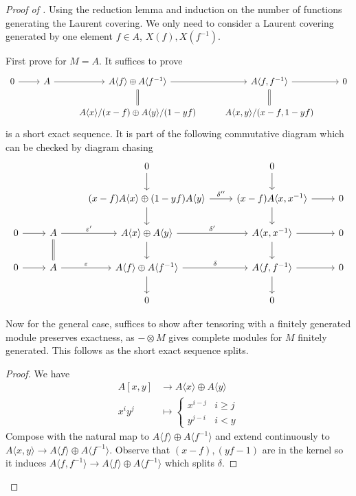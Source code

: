 \documentclass[a4paper]{article}
\begin{document}
\begin{proof}[Proof of ]
  Using the reduction lemma and induction on the number of functions generating the Laurent covering. We only need to consider a Laurent covering generated by one element \(f \in A\), \(X(f), X(f^{-1})\).

  First prove for \(M = A\). It suffices to prove
  \[
    \begin{tikzcd}
      0 \ar[r] & A \ar[r] & A \langle f\rangle \oplus A \langle f^{-1} \rangle \ar[r] \ar[d, equal] & A \langle f, f^{-1} \rangle \ar[r] \ar[d, equal] & 0 \\
      & & A\langle x\rangle/(x - f) \oplus A \langle y\rangle/(1 - yf) & A \langle x, y\rangle/(x - f, 1 - yf)
    \end{tikzcd}
  \]
  is a short exact sequence. It is part of the following commutative diagram which can be checked by diagram chasing
  \[
    \begin{tikzcd}
      & & 0 \ar[d] & 0 \ar[d] \\
      & & (x - f) A \langle x \rangle \oplus (1 - yf) A \langle y\rangle \ar[d] \ar[r, "\delta''"] & (x - f) A \langle x, x^{-1} \rangle \ar[r] \ar[d] & 0 \\
      0 \ar[r] & A \ar[r, "\varepsilon'"] \ar[d, equal] & A \langle x \rangle \oplus A \langle y\rangle \ar[r, "\delta'"] \ar[d] & A\langle x, x^{-1}\rangle \ar[r] \ar[d] & 0 \\
      0 \ar[r] & A \ar[r, "\varepsilon"] & A \langle f\rangle \oplus A \langle f^{-1} \rangle \ar[r, "\delta"] \ar[d] & A \langle f, f^{-1} \rangle \ar[r] \ar[d] & 0 \\
      & & 0 & 0
    \end{tikzcd}
  \]

  Now for the general case, suffices to show after tensoring with a finitely generated module preserves exactness, as \(- \otimes M\) gives complete modules for \(M\) finitely generated. This follows as the short exact sequence splits.

  \begin{proof}
    We have
    \begin{align*}
      A[x, y] &\to A \langle x \rangle \oplus A \langle y\rangle \\
      x^iy^j &\mapsto
               \begin{cases}
                 x^{i - j} & i \geq j \\
                 y^{j - i} & i < y
               \end{cases}
    \end{align*}
    Compose with the natural map to \(A \langle f \rangle \oplus A \langle f^{-1} \rangle\) and extend continuously to \(A \langle x, y \rangle \to A \langle f \rangle \oplus A \langle f^{-1} \rangle\). Observe that \((x - f), (yf - 1)\) are in the kernel so it induces \(A \langle f, f^{-1} \rangle \to A \langle f\rangle \oplus A \langle f^{-1}\rangle\) which splits \(\delta\).
  \end{proof}
\end{proof}
\end{document}
